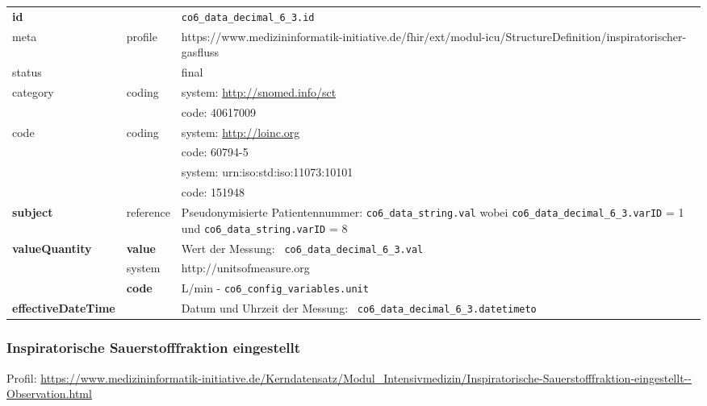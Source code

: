 \clearpage

\begin{longtable}{|l|l|p{7.5cm}|}
        \hline
        \rowcolor{lightgray} \multicolumn{3}{|l|}{Data Mapping (inhaltlich)} \\ \hline
        \textbf{id} &  & \texttt{co6\_data\_decimal\_6\_3.id} \\ \hline
	meta & profile & https://www.medizininformatik-initiative.de/fhir/ext/modul-icu/StructureDefinition/inspiratorischer-gasfluss \\ \hline 
	status &  & final   \\ \hline 
	category & coding & system: \url{http://snomed.info/sct} \\
\cline{3-3}
	& & code: 40617009 \\ \hline
	code & coding & system: \url{http://loinc.org} \\ 
	\cline{3-3} 
	&  & code: 60794-5 \\ 
	\cline{3-3} 
	&  & system: urn:iso:std:iso:11073:10101 \\ 
	\cline{3-3}
	&  & code: 151948 \\ \hline
	 \textbf{subject} & reference & Pseudonymisierte Patientennummer: \texttt{co6\_data\_string.val} wobei \texttt{co6\_data\_decimal\_6\_3.varID} = 1 und \texttt{co6\_data\_string.varID} = 8 \\ \hline
	 \textbf{valueQuantity}  & \textbf{value} & Wert der Messung: \texttt{
co6\_data\_decimal\_6\_3.val} \\
        \cline{2-3}
         & system & http://unitsofmeasure.org \\
         \cline{2-3}
         & \textbf{code} & L/min - \texttt{co6\_config\_variables.unit} \\ \hline
     \textbf{effectiveDateTime}  & & Datum und Uhrzeit der Messung: \texttt{
co6\_data\_decimal\_6\_3.datetimeto} \\
     \hline
\end{longtable}

\subsubsection{Inspiratorische Sauerstofffraktion eingestellt} 

Profil: \url{https://www.medizininformatik-initiative.de/Kerndatensatz/Modul_Intensivmedizin/Inspiratorische-Sauerstofffraktion-eingestellt--Observation.html}

